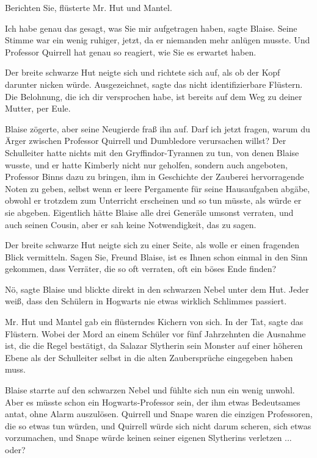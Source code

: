 \glqq{}Berichten Sie\grqq{}, flüsterte Mr. Hut und Mantel.

\glqq{}Ich habe genau das gesagt, was Sie mir aufgetragen haben\grqq{}, sagte
Blaise. Seine Stimme war ein wenig ruhiger, jetzt, da er niemanden mehr anlügen
musste. \glqq{}Und Professor Quirrell hat genau so reagiert, wie Sie es erwartet
haben.\grqq{}

Der breite schwarze Hut neigte sich und richtete sich auf, als ob der Kopf
darunter nicken würde. \glqq{}Ausgezeichnet\grqq{}, sagte das nicht
identifizierbare Flüstern. \glqq{}Die Belohnung, die ich dir versprochen habe,
ist bereits auf dem Weg zu deiner Mutter, per Eule.\grqq{}

Blaise zögerte, aber seine Neugierde fraß ihn auf. \glqq{}Darf ich jetzt fragen,
warum du Ärger zwischen Professor Quirrell und Dumbledore verursachen willst?\grqq{}
Der Schulleiter hatte nichts mit den Gryffindor-Tyrannen zu tun, von denen
Blaise wusste, und er hatte Kimberly nicht nur geholfen, sondern auch angeboten,
Professor Binns dazu zu bringen, ihm in Geschichte der Zauberei hervorragende
Noten zu geben, selbst wenn er leere Pergamente für seine Hausaufgaben abgäbe,
obwohl er trotzdem zum Unterricht erscheinen und so tun müsste, als würde er sie
abgeben. Eigentlich hätte Blaise alle drei Generäle umsonst verraten, und auch
seinen Cousin, aber er sah keine Notwendigkeit, das zu sagen.

Der breite schwarze Hut neigte sich zu einer Seite, als wolle er einen fragenden
Blick vermitteln. \glqq{}Sagen Sie, Freund Blaise, ist es Ihnen schon einmal in
den Sinn gekommen, dass Verräter, die so oft verraten, oft ein böses Ende
finden?\grqq{}

\glqq{}Nö\grqq{}, sagte Blaise und blickte direkt in den schwarzen Nebel unter
dem Hut. \glqq{}Jeder weiß, dass den Schülern in Hogwarts nie etwas wirklich
Schlimmes passiert.\grqq{}

Mr. Hut und Mantel gab ein flüsterndes Kichern von sich. \glqq{}In der
Tat\grqq{}, sagte das Flüstern. \glqq{}Wobei der Mord an einem Schüler vor fünf
Jahrzehnten die Ausnahme ist, die die Regel bestätigt, da Salazar Slytherin sein
Monster auf einer höheren Ebene als der Schulleiter selbst in die alten
Zaubersprüche eingegeben haben muss.\grqq{}

Blaise starrte auf den schwarzen Nebel und fühlte sich nun ein wenig unwohl.
Aber es müsste schon ein Hogwarts-Professor sein, der ihm etwas Bedeutsames
antat, ohne Alarm auszulösen. Quirrell und Snape waren die einzigen Professoren,
die so etwas tun würden, und Quirrell würde sich nicht darum scheren, sich etwas
vorzumachen, und Snape würde keinen seiner eigenen Slytherins verletzen ...
oder?

